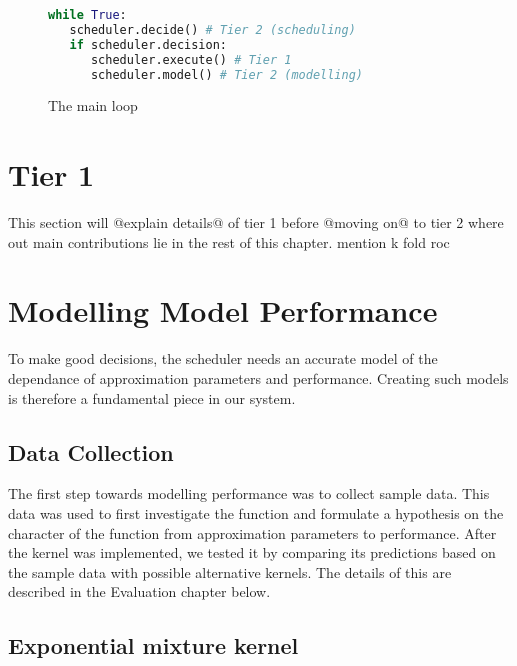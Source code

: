 \documentclass[a4paper,12pt,twoside,openright]{report}
\begin{document}
\begin{figure}[ht]
\begin{lstlisting}[language=Python]
while True:
   scheduler.decide() # Tier 2 (scheduling)
   if scheduler.decision:
      scheduler.execute() # Tier 1
      scheduler.model() # Tier 2 (modelling)
\end{lstlisting}
\caption{The main loop}
\label{mainloop}
\end{figure}





\section{Tier 1}
This section will @explain details@ of tier 1 before @moving on@ to tier 2 where out main contributions lie in the rest of this chapter.
mention k fold
roc

\section{Modelling Model Performance}
To make good decisions, the scheduler needs an accurate model of the dependance of approximation parameters and performance. Creating such models is therefore a fundamental piece in our system.

\subsection{Data Collection}
The first step towards modelling performance was to collect sample data. This data was used to first investigate the function and formulate a hypothesis on the character of the function from approximation parameters to performance. After the kernel was implemented, we tested it by comparing its predictions based on the sample data with possible alternative kernels. The details of this are described in the Evaluation chapter below.









\subsection{Exponential mixture kernel}
\end{document}
